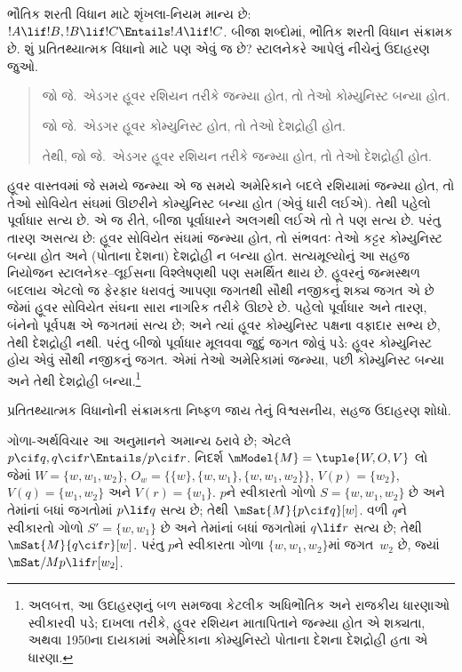 \begingroup
\makeatletter{}\makeatother


\label{guunit:OLP-0527}


ભૌતિક શરતી વિધાન માટે શૃંખલા-નિયમ માન્ય છે: $!A \lif !B, !B
\lif !C \Entails !A \lif !C$. બીજા શબ્દોમાં, ભૌતિક શરતી વિધાન
સંક્રામક છે. શું પ્રતિતથ્યાત્મક વિધાનો માટે પણ એવું જ છે? સ્ટાલનેકરે
આપેલું નીચેનું ઉદાહરણ જુઓ.
\begin{quote}
  જો જે.~એડગર હૂવર રશિયન તરીકે જન્મ્યા હોત, તો તેઓ કોમ્યુનિસ્ટ બન્યા હોત.

  જો જે.~એડગર હૂવર કોમ્યુનિસ્ટ હોત, તો તેઓ દેશદ્રોહી હોત.

  તેથી, જો જે.~એડગર હૂવર રશિયન તરીકે જન્મ્યા હોત, તો તેઓ દેશદ્રોહી હોત.
\end{quote}
હૂવર વાસ્તવમાં જે સમયે જન્મ્યા એ જ સમયે અમેરિકાને બદલે રશિયામાં
જન્મ્યા હોત, તો તેઓ સોવિયેત સંઘમાં ઊછરીને કોમ્યુનિસ્ટ બન્યા હોત
(એવું ધારી લઈએ). તેથી પહેલો પૂર્વાધાર સત્ય છે. એ જ રીતે, બીજા
પૂર્વાધારને અલગથી લઈએ તો તે પણ સત્ય છે. પરંતુ તારણ અસત્ય છે:
હૂવર સોવિયેત સંઘમાં જન્મ્યા હોત, તો સંભવતઃ તેઓ કટ્ટર કોમ્યુનિસ્ટ
બન્યા હોત અને (પોતાના દેશના) દેશદ્રોહી ન બન્યા હોત. સત્યમૂલ્યોનું
આ સહજ નિયોજન સ્ટાલનેકર--લૂઈસના વિશ્લેષણથી પણ સમર્થિત થાય છે.
હૂવરનું જન્મસ્થળ બદલાય એટલો જ ફેરફાર ધરાવતું આપણા જગતથી સૌથી
નજીકનું શક્ય જગત એ છે જેમાં હૂવર સોવિયેત સંઘના સારા નાગરિક તરીકે
ઊછરે છે. પહેલો પૂર્વાધાર અને તારણ, બંનેનો પૂર્વપક્ષ એ જગતમાં સત્ય
છે; અને ત્યાં હૂવર કોમ્યુનિસ્ટ પક્ષના વફાદાર સભ્ય છે, તેથી દેશદ્રોહી
નથી. પરંતુ બીજો પૂર્વાધાર મૂલવવા જુદું જગત જોવું પડે: હૂવર
કોમ્યુનિસ્ટ હોય એવું સૌથી નજીકનું જગત. એમાં તેઓ અમેરિકામાં જન્મ્યા,
પછી કોમ્યુનિસ્ટ બન્યા અને તેથી દેશદ્રોહી બન્યા.\footnote{અલબત્ત, આ
  ઉદાહરણનું બળ સમજવા કેટલીક અધિભૌતિક અને રાજકીય ધારણાઓ સ્વીકારવી
  પડે; દાખલા તરીકે, હૂવર રશિયન માતાપિતાને જન્મ્યા હોત એ શક્યતા,
  અથવા 1950ના દાયકામાં અમેરિકાના કોમ્યુનિસ્ટો પોતાના દેશના
  દેશદ્રોહી હતા એ ધારણા.}

\begin{prob}
  પ્રતિતથ્યાત્મક વિધાનોની સંક્રામકતા નિષ્ફળ જાય તેનું વિશ્વસનીય,
  સહજ ઉદાહરણ શોધો.
\end{prob}

\begin{ex}
  ગોળા-અર્થવિચાર આ અનુમાનને અમાન્ય ઠરાવે છે; એટલે $p
  \cif q, q \cif r \Entails/ p \cif r$. નિદર્શ $\mModel{M}
  = \tuple{W, O, V}$ લો જેમાં $W = \{w, w_1, w_2\}$,
  $O_w = \{\{w\}, \{w, w_1\}, \{w, w_1, w_2\}\}$,
  $V(p) = \{w_2\}$, $V(q) = \{w_1, w_2\}$ અને
  $V(r) = \{w_1\}$. $p$ને સ્વીકારતો ગોળો $S = \{w, w_1,
  w_2\}$ છે અને તેમાંનાં બધાં જગતોમાં $p \lif q$ સત્ય છે; તેથી
  $\mSat{M}{p \cif q}[w]$. વળી $q$ને સ્વીકારતો ગોળો
  $S' = \{w, w_1\}$ છે અને તેમાંનાં બધાં જગતોમાં
  $q \lif r$ સત્ય છે; તેથી
  $\mSat{M}{q \cif r}[w]$. પરંતુ $p$ને સ્વીકારતા ગોળા
  $\{w, w_1, w_2\}$માં જગત~$w_2$ છે, જ્યાં
  $\mSat/{M}{p \lif r}[w_2]$.
\end{ex}

